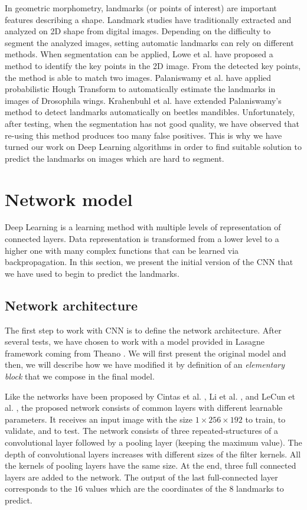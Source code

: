 \documentclass[10pt]{article}
\begin{document}
In geometric morphometry, landmarks (or points of interest) are important features describing a shape. Landmark studies have traditionally extracted and 
analyzed on 2D shape from digital images. Depending on the difficulty to segment the analyzed images, setting automatic landmarks can rely on different methods. When segmentation can be applied, Lowe et
al. \cite{lowe2004distinctive} have proposed a method to identify the
key points in the 2D image. From the detected key points, the method
is able to match two images. Palaniswamy et
al. \cite{palaniswamy2010automatic} have applied probabilistic Hough
Transform to automatically estimate the landmarks in images of
Drosophila wings. Krahenbuhl et al. \cite{le2017maelab} have extended
Palaniswamy's method to detect landmarks automatically on beetles
mandibles. Unfortunately, after testing, when the segmentation has not good quality,
we have observed that re-using this method produces too many
false positives. This is why we have turned our work on Deep Learning
algorithms in order to find suitable solution to predict the landmarks
on images which are hard to segment.


\section{Network model}
Deep Learning is a learning method with multiple levels of
representation of connected layers. Data representation is transformed from a lower level to a
higher one with many complex functions that can be learned via
backpropagation. In this section, we present the initial version of the CNN that we have used
to begin to predict the landmarks. 

\subsection{Network architecture}
\label{secmodel}
The first step to work with CNN is to define the network
architecture. After several tests, we have chosen to work with a model provided in Lasagne framework \cite{lasagne} coming from
Theano \cite{2016arXiv160502688short}. We will first present the
original model and then, we will describe how we have modified it by definition of an
\textit{elementary block} that we compose in the final model.

Like the networks have been proposed by Cintas et al. \cite{cintas2016automatic}, Li et al. \cite{li2015convolutional}, and  LeCun et al. \cite{lecun2010convolutional}, the proposed network consists of common layers
with different learnable parameters. It receives an input image with
the size  $1 \times 256 \times 192$ to train, to validate, and to
test. The network consists of three repeated-structures of a convolutional layer
followed by a pooling layer (keeping the maximum value). The depth of convolutional layers increases with different sizes of the filter kernels.
All the kernels of pooling layers have the same size. 
At the end, three full connected layers are added to the
network. The output of the last full-connected
layer corresponds to the $16$ values which are the coordinates of the
$8$ landmarks to predict.
\end{document}
